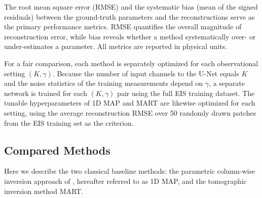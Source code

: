 \documentclass[linenumbers,twocolumn]{aastex7}
\begin{document}
The root mean square error (RMSE) and the systematic bias (mean of the signed
residuals) between the ground-truth parameters and the reconstructions serve as
the primary performance metrics. RMSE quantifies the overall magnitude of
reconstruction error, while bias reveals whether a method systematically over-
or under-estimates a parameter. All metrics are reported in physical units.

For a fair comparison, each method is separately optimized for each
observational setting $(K, \gamma)$. Because the number of input channels to
the U-Net equals $K$ and the noise statistics of the training measurements
depend on $\gamma$, a separate network is trained for each $(K, \gamma)$ pair
using the full EIS training dataset. The tunable hyperparameters of 1D MAP and
MART are likewise optimized for each setting, using the average reconstruction
RMSE over 50 randomly drawn patches from the EIS training set as the criterion.

\subsection{Compared Methods}
Here we describe the two classical baseline methods: the parametric
column-wise inversion approach of \citet{davila2019slitless}, hereafter referred
to as 1D MAP, and the tomographic inversion method MART.
\end{document}
